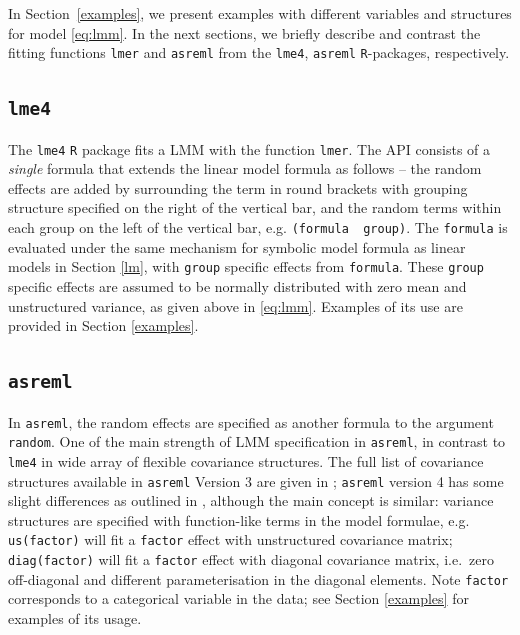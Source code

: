 \documentclass[runningheads]{llncs}\usepackage[]{graphicx}\usepackage[]{color}
\begin{document}
In Section~\ref{examples}, we present examples with different variables and structures for model \eqref{eq:lmm}. In the next sections, we briefly describe and contrast the fitting functions \texttt{lmer} and \texttt{asreml} from the \texttt{lme4},  \texttt{asreml} \texttt{R}-packages, respectively.

\hypertarget{lme4::lmer}{%
	\subsection{\texorpdfstring{\texttt{lme4}}{lme4}}\label{lme4}}

The \texttt{lme4} \texttt{R} package fits a LMM with the function \texttt{lmer}. The API consists of a \emph{single} formula that extends the linear model formula as follows -- the random effects are added by surrounding the term in round brackets with grouping structure specified on the right of the vertical bar, and the random terms within each group on the left of the vertical bar, e.g. \texttt{(formula\ \textbar{}\ group)}. The \texttt{formula} is evaluated under the same mechanism for symbolic model formula as linear models in Section \ref{lm}, with \texttt{group} specific effects from \texttt{formula}. These \texttt{group} specific effects are assumed to be normally distributed with zero mean and unstructured variance, as given above in \eqref{eq:lmm}. Examples of its use are provided in Section \ref{examples}.

\hypertarget{asreml::asreml}{%
	\subsection{\texorpdfstring{\texttt{asreml}}{asreml}}\label{asreml}}

In \texttt{asreml}, the random effects are specified as another formula to the argument \texttt{random}. One of the main strength of LMM specification in \texttt{asreml}, in contrast to \texttt{lme4} in wide array of flexible covariance structures. The full list of covariance structures available in \texttt{asreml} Version 3 are given in \citet{Butler2009}; \texttt{asreml} version 4 has some slight differences as outlined in \citet{Butler2018}, although the main concept is similar: variance structures are specified with function-like terms in the model formulae, e.g. \texttt{us(factor)} will fit a \texttt{factor} effect with unstructured covariance matrix; \texttt{diag(factor)} will fit a \texttt{factor} effect with diagonal covariance matrix, i.e.~zero off-diagonal and different parameterisation in the diagonal elements. Note \texttt{factor} corresponds to a categorical variable in the data; see Section \ref{examples} for examples of its usage.
\end{document}
